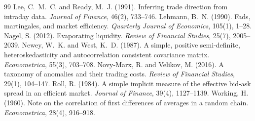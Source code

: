 \begin{thebibliography}{99}
 Lee, C.~M.~C. and Ready, M.~J. (1991). Inferring trade direction from intraday data. \emph{Journal of Finance}, 46(2), 733--746.
 Lehmann, B.~N. (1990). Fads, martingales, and market efficiency. \emph{Quarterly Journal of Economics}, 105(1), 1--28.
 Nagel, S. (2012). Evaporating liquidity. \emph{Review of Financial Studies}, 25(7), 2005--2039.
 Newey, W.~K. and West, K.~D. (1987). A simple, positive semi-definite, heteroskedasticity and autocorrelation consistent covariance matrix. \emph{Econometrica}, 55(3), 703--708.
 Novy-Marx, R. and Velikov, M. (2016). A taxonomy of anomalies and their trading costs. \emph{Review of Financial Studies}, 29(1), 104--147.
 Roll, R. (1984). A simple implicit measure of the effective bid-ask spread in an efficient market. \emph{Journal of Finance}, 39(4), 1127--1139.
 Working, H. (1960). Note on the correlation of first differences of averages in a random chain. \emph{Econometrica}, 28(4), 916--918.
\end{thebibliography}
